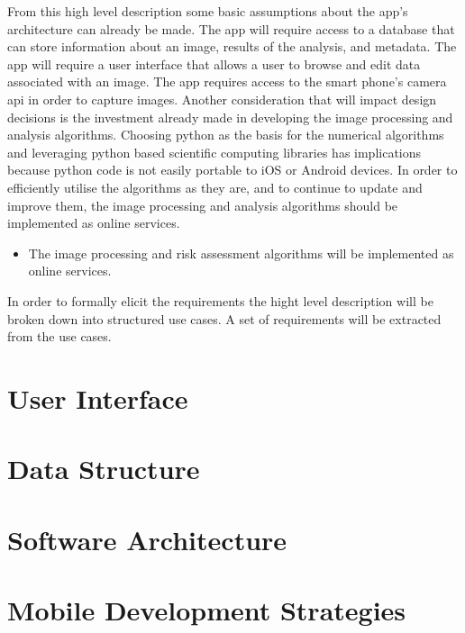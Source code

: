 From this high level description some basic assumptions about the app’s architecture can already be made. The app will require access to a database that can store information about an image, results of the analysis, and metadata. The app will require a user interface that allows a user to browse and edit data associated with an image. The app requires access to the smart phone’s camera api in order to capture images.
Another consideration that will impact design decisions is the investment already made in developing the image processing and analysis algorithms. Choosing python as the basis for the numerical algorithms and leveraging python based scientific computing libraries has implications because python code is not easily portable to iOS or Android devices. In order to efficiently utilise the algorithms as they are, and to continue to update and improve them, the image processing and analysis algorithms should be implemented as online services.

\begin{itemize}[label={}]
\item The image processing and risk assessment algorithms will be implemented as online services.
\end{itemize}

In order to formally elicit the requirements the hight level description will be broken down into structured use cases. A set of requirements will be extracted from the use cases.



\section{User Interface}


\section{Data Structure}


\section{Software Architecture}


\section{Mobile Development Strategies}


